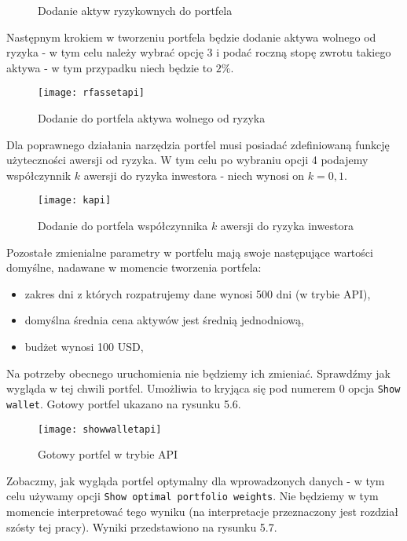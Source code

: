 \documentclass[magister]{dyplom}
\def\code#1{\texttt{#1}}
\begin{document}
\begin{figure}[hb]
	\centering
	\quad
	\caption{Dodanie aktyw ryzykownych do portfela}
\end{figure}

Następnym krokiem w tworzeniu portfela będzie dodanie aktywa wolnego od ryzyka - w tym celu należy wybrać opcję 3 i podać roczną stopę zwrotu takiego aktywa - w tym przypadku niech będzie to $2\%$.
\newpage
\begin{figure}[ht]
	\centering
	\texttt{[image: rfassetapi]}
	\caption{Dodanie do portfela aktywa wolnego od ryzyka}
\end{figure}

Dla poprawnego działania narzędzia portfel musi posiadać zdefiniowaną funkcję użyteczności awersji od ryzyka. W tym celu po wybraniu opcji 4 podajemy współczynnik $k$ awersji do ryzyka inwestora - niech wynosi on $k=0,1$.

\begin{figure}[ht]
	\centering
	\texttt{[image: kapi]}
	\caption{Dodanie do portfela współczynnika $k$ awersji do ryzyka inwestora}
\end{figure}

Pozostałe zmienialne parametry w portfelu mają swoje następujące wartości domyślne, nadawane w momencie tworzenia portfela:

\begin{itemize}
	\item zakres dni z których rozpatrujemy dane wynosi 500 dni (w trybie API),
	\item domyślna średnia cena aktywów jest średnią jednodniową,
	\item budżet wynosi 100 USD,
\end{itemize}
Na potrzeby obecnego uruchomienia nie będziemy ich zmieniać. Sprawdźmy jak wygląda w tej chwili portfel. Umożliwia to kryjąca się pod numerem $0$ opcja \code{Show wallet}. Gotowy portfel ukazano na rysunku 5.6.
\newpage
\begin{figure}[ht]
	\centering
	\texttt{[image: showwalletapi]}
	\caption{Gotowy portfel w trybie API}
\end{figure}

Zobaczmy, jak wygląda portfel optymalny dla wprowadzonych danych - w tym celu używamy opcji \code{Show optimal portfolio weights}. Nie będziemy w tym momencie interpretować tego wyniku (na interpretacje przeznaczony jest rozdział szósty tej pracy). Wyniki przedstawiono na rysunku 5.7.
\end{document}

